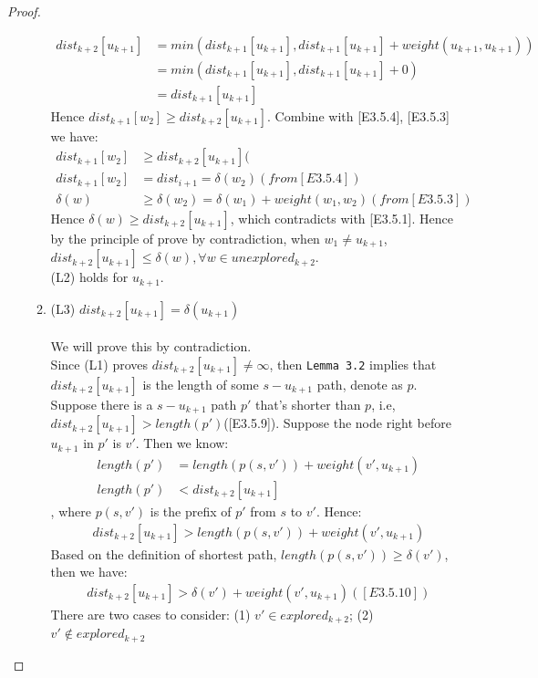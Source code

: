 \documentclass[11pt, oneside]{article}   	%
\theoremstyle{definition}
\begin{document}
\begin{proof}
\begin{itemize}
\begin{enumerate}
\begin{align*}
  dist_{k+2}[u_{k+1}] &= min(dist_{k+1}[u_{k+1}], dist_{k+1}[u_{k+1}] + weight(u_{k+1}, u_{k+1})) \\
                      &= min(dist_{k+1}[u_{k+1}], dist_{k+1}[u_{k+1}] + 0) \\
                      &= dist_{k+1}[u_{k+1}] 
  \end{align*}
  Hence $dist_{k+1}[w_2] \geq dist_{k+2}[u_{k+1}]$. Combine with [E3.5.4], [E3.5.3] we have: 
  \begin{align*}
    dist_{k+1}[w_2] &\geq dist_{k+2}[u_{k+1}] (\\
    dist_{k+1}[w_2] &= dist_{i+1} = \delta(w_2) (from [E3.5.4]) \\
    \delta(w) &\geq \delta(w_2) = \delta(w_1) + weight(w_1, w_2)(from [E3.5.3])
  \end{align*}
  Hence $\delta(w) \geq dist_{k+2}[u_{k+1}]$, which contradicts with [E3.5.1]. Hence by the principle of prove by contradiction, when $w_1 \neq u_{k+1}$, $dist_{k+2}[u_{k+1}] \leq \delta(w), \forall w \in unexplored_{k+2}$. 
  \\
  (L2) holds for $u_{k+1}$. 
  \\
  \item (L3) $dist_{k+2}[u_{k+1}] = \delta(u_{k+1})$
  \\\\
  We will prove this by contradiction. 
  \\
  Since (L1) proves $dist_{k+2}[u_{k+1}] \neq \infty$, then \texttt{Lemma 3.2} implies that $dist_{k+2}[u_{k+1}]$ is the length of some $s-u_{k+1}$ path, denote as $p$. Suppose there is a $s-u_{k+1}$ path $p'$ that's shorter than $p$, i.e, $dist_{k+2}[u_{k+1}] > length(p')$([E3.5.9]). Suppose the node right before $u_{k+1}$ in $p'$ is $v'$. Then we know: 
  \begin{align*}
  length(p') &= length(p(s, v')) + weight(v', u_{k+1}) \\
  length(p') &< dist_{k+2}[u_{k+1}]
  \end{align*}
  , where $p(s, v')$ is the prefix of $p'$ from $s$ to $v'$. Hence: 
  \begin{align*}
   dist_{k+2}[u_{k+1}] > length(p(s, v')) + weight(v', u_{k+1}) 
  \end{align*}
  Based on the definition of shortest path, $length(p(s, v')) \geq \delta(v')$, then we have: 
  \begin{align*}
   dist_{k+2}[u_{k+1}] > \delta(v') + weight(v', u_{k+1}) ([E3.5.10])
  \end{align*}
  There are two cases to consider: (1) $v' \in explored_{k+2}$; (2) $v' \notin explored_{k+2}$

\end{enumerate}
\end{itemize}
\end{proof}
\end{document}
